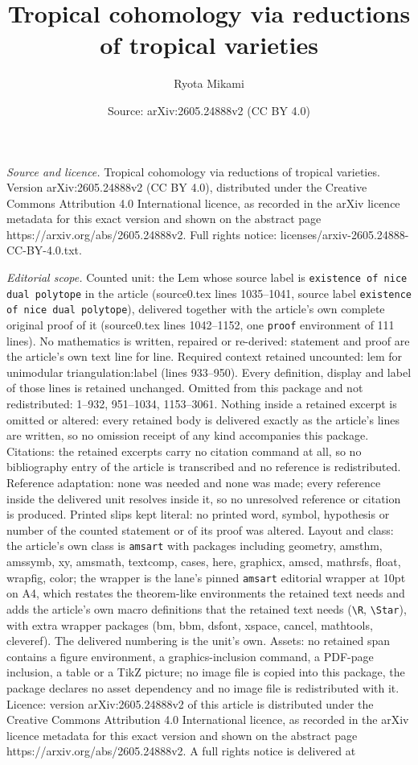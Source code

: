 \documentclass[10pt,a4paper]{amsart}
\title[Tropical cohomology via reductions of tropical varieties]{Tropical cohomology via reductions of tropical varieties}
\author{Ryota Mikami}
\date{Source: arXiv:2605.24888v2 (CC BY 4.0)}
\begin{document}
\maketitle

\noindent\emph{Source and licence.} Tropical cohomology via reductions of tropical varieties. Version arXiv:2605.24888v2 (CC BY 4.0), distributed under the Creative Commons Attribution 4.0 International licence, as recorded in the arXiv licence metadata for this exact version and shown on the abstract page https://arxiv.org/abs/2605.24888v2. Full rights notice: licenses/arxiv-2605.24888-CC-BY-4.0.txt.\par\smallskip

\noindent\textit{Editorial scope.} Counted unit: the Lem whose source label is \texttt{existence of nice dual polytope} in the article (source0.tex lines 1035--1041, source label \texttt{existence of nice dual polytope}), delivered together with the article's own complete original proof of it (source0.tex lines 1042--1152, one \texttt{proof} environment of 111 lines). No mathematics is written, repaired or re-derived: statement and proof are the article's own text line for line. Required context retained uncounted: lem for unimodular triangulation:label (lines 933--950). Every definition, display and label of those lines is retained unchanged. Omitted from this package and not redistributed: 1--932, 951--1034, 1153--3061. Nothing inside a retained excerpt is omitted or altered: every retained body is delivered exactly as the article's lines are written, so no omission receipt of any kind accompanies this package. Citations: the retained excerpts carry no citation command at all, so no bibliography entry of the article is transcribed and no reference is redistributed. Reference adaptation: none was needed and none was made; every reference inside the delivered unit resolves inside it, so no unresolved reference or citation is produced. Printed slips kept literal: no printed word, symbol, hypothesis or number of the counted statement or of its proof was altered. Layout and class: the article's own class is \texttt{amsart} with packages including geometry, amsthm, amssymb, xy, amsmath, textcomp, cases, here, graphicx, amscd, mathrsfs, float, wrapfig, color; the wrapper is the lane's pinned \texttt{amsart} editorial wrapper at 10pt on A4, which restates the theorem-like environments the retained text needs and adds the article's own macro definitions that the retained text needs (\texttt{\textbackslash R}, \texttt{\textbackslash Star}), with extra wrapper packages (bm, bbm, dsfont, xspace, cancel, mathtools, cleveref). The delivered numbering is the unit's own. Assets: no retained span contains a figure environment, a graphics-inclusion command, a PDF-page inclusion, a table or a TikZ picture; no image file is copied into this package, the package declares no asset dependency and no image file is redistributed with it. Licence: version arXiv:2605.24888v2 of this article is distributed under the Creative Commons Attribution 4.0 International licence, as recorded in the arXiv licence metadata for this exact version and shown on the abstract page https://arxiv.org/abs/2605.24888v2. A full rights notice is delivered at 
\end{document}
